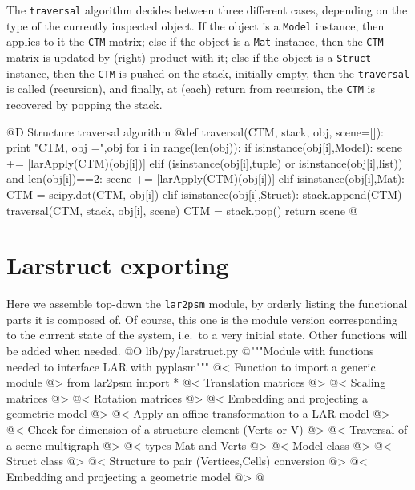 \documentclass[11pt,oneside]{article}    %
\begin{document}
The \texttt{traversal} algorithm decides between three different cases, depending on the type of the currently inspected object. If the object is a \texttt{Model} instance, then applies to it the \texttt{CTM} matrix; else if the object is a \texttt{Mat} instance, then the \texttt{CTM} matrix is updated by (right) product with it; else if the object is a \texttt{Struct} instance, then the \texttt{CTM} is pushed on the stack, initially empty, then the \texttt{traversal} is called (recursion), and finally, at (each) return from recursion, the \texttt{CTM} is recovered by popping the stack.

@D Structure traversal algorithm 
@{def traversal(CTM, stack, obj, scene=[]):
    print "\n CTM, obj =",obj
    for i in range(len(obj)):
        if isinstance(obj[i],Model): 
            scene += [larApply(CTM)(obj[i])]
        elif (isinstance(obj[i],tuple) or isinstance(obj[i],list)) and len(obj[i])==2:
            scene += [larApply(CTM)(obj[i])]
        elif isinstance(obj[i],Mat): 
            CTM = scipy.dot(CTM, obj[i])
        elif isinstance(obj[i],Struct):
            stack.append(CTM) 
            traversal(CTM, stack, obj[i], scene)
            CTM = stack.pop()
    return scene
@}


\section{Larstruct exporting}
\label{sec:larstruct}
Here we assemble top-down the \texttt{lar2psm} module, by orderly listing the functional parts it is composed of. Of course, this one is the module version corresponding to the current state of the system, i.e.~to a very initial state. Other functions will be added when needed.
@O lib/py/larstruct.py
@{"""Module with functions needed to interface LAR with pyplasm"""
@< Function to import a generic module @>
from lar2psm import *
@< Translation matrices @>
@< Scaling matrices @>
@< Rotation matrices @>
@< Embedding and projecting a geometric model @>
@< Apply an affine transformation to a LAR model @>
@< Check for dimension of a structure element (Verts or V) @>
@< Traversal of a scene multigraph @>
@< types Mat and Verts @>
@< Model class @>
@< Struct class @>
@< Structure to pair (Vertices,Cells) conversion @>
@< Embedding and projecting a geometric model @>
@}
\end{document}
